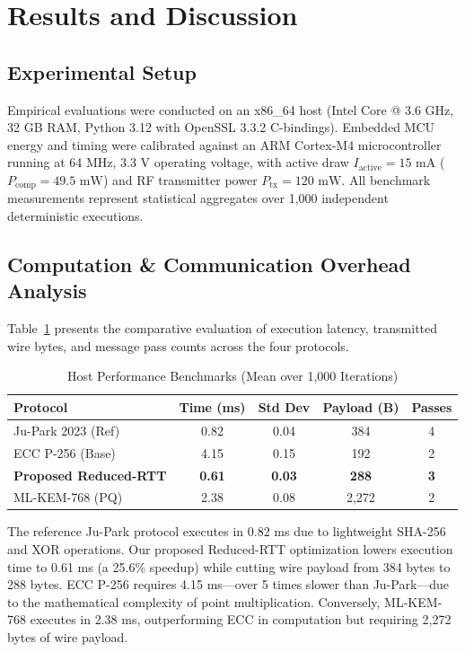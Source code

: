 \documentclass[journal,10pt,twocolumn]{IEEEtran}
\begin{document}
\section{Results and Discussion}

\subsection{Experimental Setup}
Empirical evaluations were conducted on an x86\_64 host (Intel Core @ 3.6 GHz, 32 GB RAM, Python 3.12 with OpenSSL 3.3.2 C-bindings). Embedded MCU energy and timing were calibrated against an ARM Cortex-M4 microcontroller running at 64 MHz, 3.3 V operating voltage, with active draw $I_{\text{active}} = 15\text{ mA}$ ($P_{\text{comp}} = 49.5\text{ mW}$) and RF transmitter power $P_{\text{tx}} = 120\text{ mW}$. All benchmark measurements represent statistical aggregates over 1,000 independent deterministic executions.

\subsection{Computation \& Communication Overhead Analysis}
Table~\ref{tab:bench_results} presents the comparative evaluation of execution latency, transmitted wire bytes, and message pass counts across the four protocols.

\begin{table}[htbp]
\caption{Host Performance Benchmarks (Mean over 1,000 Iterations)}
\begin{center}
\begin{tabular}{lcccc}
\toprule
\textbf{Protocol} & \textbf{Time (ms)} & \textbf{Std Dev} & \textbf{Payload (B)} & \textbf{Passes} \\
\midrule
Ju-Park 2023 (Ref) & 0.82 & 0.04 & 384 & 4 \\
ECC P-256 (Base) & 4.15 & 0.15 & 192 & 2 \\
\textbf{Proposed Reduced-RTT} & \textbf{0.61} & \textbf{0.03} & \textbf{288} & \textbf{3} \\
ML-KEM-768 (PQ) & 2.38 & 0.08 & 2,272 & 2 \\
\bottomrule
\end{tabular}
\label{tab:bench_results}
\end{center}
\end{table}

The reference Ju-Park protocol executes in 0.82 ms due to lightweight SHA-256 and XOR operations. Our proposed Reduced-RTT optimization lowers execution time to 0.61 ms (a 25.6\% speedup) while cutting wire payload from 384 bytes to 288 bytes. ECC P-256 requires 4.15 ms—over 5 times slower than Ju-Park—due to the mathematical complexity of point multiplication. Conversely, ML-KEM-768 executes in 2.38 ms, outperforming ECC in computation but requiring 2,272 bytes of wire payload.
\end{document}
